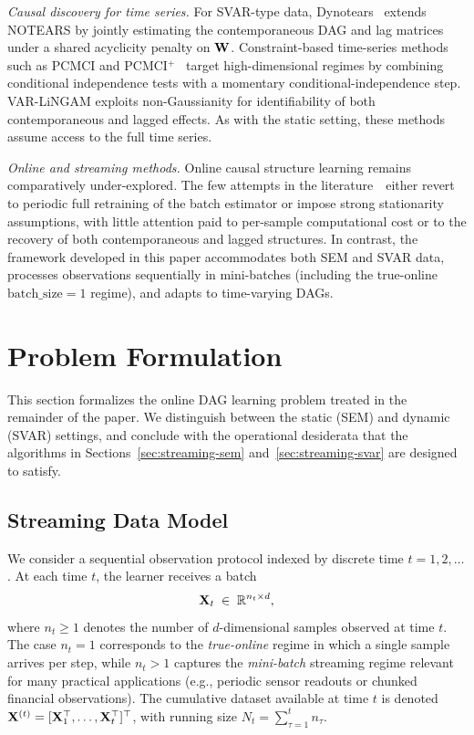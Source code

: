 \documentclass[journal,twoside]{IEEEtran}
\newcommand{\missref}{\red{[REF]}}
\begin{document}
\textit{Causal discovery for time series.} For SVAR-type data,
Dynotears~\cite{pamfil2020dynotears} extends NOTEARS by jointly
estimating the contemporaneous DAG and lag matrices under a shared
acyclicity penalty on ${\mathbf W}$. Constraint-based time-series methods such
as PCMCI and PCMCI$^+$~\cite{runge2019pcmci, runge2020pcmciplus} target
high-dimensional regimes by combining conditional independence tests
with a momentary conditional-independence step. VAR-LiNGAM
\cite{hyvarinen2010varlingam} exploits non-Gaussianity for
identifiability of both contemporaneous and lagged effects. As with the
static setting, these methods assume access to the full time series.

\textit{Online and streaming methods.} Online causal structure learning
remains comparatively under-explored. The few attempts in the
literature~\missref\ either revert to periodic full retraining of the
batch estimator or impose strong stationarity assumptions, with little
attention paid to per-sample computational cost or to the recovery of
both contemporaneous and lagged structures. In contrast, the framework
developed in this paper accommodates both SEM and SVAR data, processes
observations sequentially in mini-batches (including the true-online
$\mathrm{batch\_size} = 1$ regime), and adapts to time-varying DAGs.


\section{Problem Formulation}
\label{sec:problem}

This section formalizes the online DAG learning problem treated in the
remainder of the paper. We distinguish between the static (SEM) and
dynamic (SVAR) settings, and conclude with the operational desiderata
that the algorithms in Sections~\ref{sec:streaming-sem}
and~\ref{sec:streaming-svar} are designed to satisfy.

\subsection{Streaming Data Model}
\label{sec:streaming-data}
We consider a sequential observation protocol indexed by discrete time
$t = 1, 2, \ldots$. At each time $t$, the learner receives a batch
\begin{equation}
\label{eq:batch}
{\ensuremath{\mathbf X}}_t \;\in\; \mathbb{R}^{n_t \times d},
\end{equation}
where $n_t \geq 1$ denotes the number of $d$-dimensional samples observed
at time $t$. The case $n_t = 1$ corresponds to the \emph{true-online}
regime in which a single sample arrives per step, while $n_t > 1$
captures the \emph{mini-batch} streaming regime relevant for many
practical applications (e.g., periodic sensor readouts or chunked
financial observations). The cumulative dataset available at time $t$ is
denoted ${\mathbf X}^{(t)} = [{\mathbf X}_1^\top, \ldots, {\mathbf X}_t^\top]^\top$,
with running size $N_t = \sum_{\tau = 1}^{t} n_\tau$.
\end{document}
